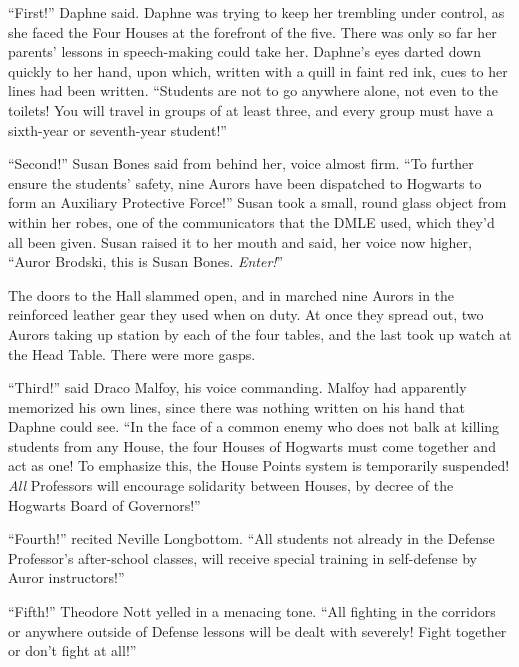 ``First!'' Daphne said. Daphne was trying to keep her trembling under control, as she faced the Four Houses at the forefront of the five. There was only so far her parents' lessons in speech-making could take her. Daphne's eyes darted down quickly to her hand, upon which, written with a quill in faint red ink, cues to her lines had been written. ``Students are not to go anywhere alone, not even to the toilets! You will travel in groups of at least three, and every group must have a sixth-year or seventh-year student!''

``Second!'' Susan Bones said from behind her, voice almost firm. ``To further ensure the students' safety, nine Aurors have been dispatched to Hogwarts to form an Auxiliary Protective Force!'' Susan took a small, round glass object from within her robes, one of the communicators that the DMLE used, which they'd all been given. Susan raised it to her mouth and said, her voice now higher, ``Auror Brodski, this is Susan Bones. \emph{Enter!}''

The doors to the Hall slammed open, and in marched nine Aurors in the reinforced leather gear they used when on duty. At once they spread out, two Aurors taking up station by each of the four tables, and the last took up watch at the Head Table. There were more gasps.

``Third!'' said Draco Malfoy, his voice commanding. Malfoy had apparently memorized his own lines, since there was nothing written on his hand that Daphne could see. ``In the face of a common enemy who does not balk at killing students from any House, the four Houses of Hogwarts must come together and act as one! To emphasize this, the House Points system is temporarily suspended! \emph{All} Professors will encourage solidarity between Houses, by decree of the Hogwarts Board of Governors!''

``Fourth!'' recited Neville Longbottom. ``All students not already in the Defense Professor's after-school classes, will receive special training in self-defense by Auror instructors!''

``Fifth!'' Theodore Nott yelled in a menacing tone. ``All fighting in the corridors or anywhere outside of Defense lessons will be dealt with severely! Fight together or don't fight at all!''

